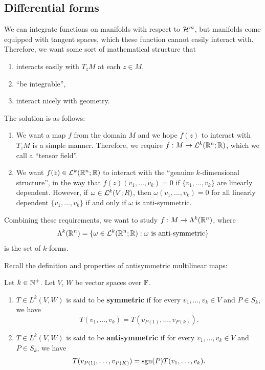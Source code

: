 \documentclass[a4paper]{article}
\begin{document}
\subsection{Differential forms}
We can integrate functions on manifolds with respect to $\mathcal{H}^m$, but
manifolds come equipped with tangent spaces, which these function cannot
easily interact with. Therefore, we want some sort of mathematical
structure that
\begin{enumerate}
  \item interacts easily with $T_z M$ at each $z \in M$,
  \item ``be integrable'',
  \item interact nicely with geometry.
\end{enumerate}

The solution is as follows:
\begin{enumerate}
  \item We want a map $f$ from the domain $M$ and we hope $f(z)$ to
        interact with $T_z M$ is a simple manner. Therefore, we require $f
        : M \to \mathcal{L}^k(\mathbb{R}^n ; \mathbb{R})$, which we call a ``tensor field''.

  \item We want $f(z) \in \mathcal{L}^k(\mathbb{R}^n ; \mathbb{R})$ to interact with the ``genuine
        $k$-dimensional structure'', in the way that $f(z) (v_1, \dots,
        v_k) = 0$ if $\{v_1, \dots, v_k\}$ are linearly dependent.
        However, if $\omega \in \mathcal{L}^k (V ; R)$, then $\omega (v_1, \dots,
        v_k) = 0$ for all linearly dependent $\{v_1, \dots, v_k\}$ if and
        only if $\omega$ is anti-symmetric.
\end{enumerate}
Combining these requirements, we want to
study $f : M \to \Lambda^k (\mathbb{R}^n)$, where
\[
  \Lambda^k (\mathbb{R}^n)
  = \{\omega \in \mathcal{L}^k(\mathbb{R}^n ; \mathbb{R}) : \omega \text{ is
    anti-symmetric}\}
\]
is the set of $k$-forms.

Recall the definition and properties of antisymmetric multilinear maps:

\begin{defi}
  Let $k \in \mathbb{N}^+$. Let $V$, $W$ be vector spaces over $\mathbb{F}$.
  \begin{enumerate}
    \item $T \in L^k(V, W)$ is said to be \textbf{symmetric}
          if for every $v_1 , \dots, v_k \in V$ and $P \in S_k$, we
          have
          \[
            T(v_1, \dots, v_k) = T(v_{P(1)}, \dots, v_{P(k)}).
          \]
    \item $T \in L^k(V, W)$ is said to be \textbf{antisymmetric}
          if for every $v_1, \dots, v_k \in V$ and $P \in S_k$, we have
          \[
            T(v_{P(1)}, \dots, v_{P(K)}) = \operatorname{sgn} (P) T(v_1, \dots, v_k).
          \]
  \end{enumerate}
\end{defi}
\end{document}

